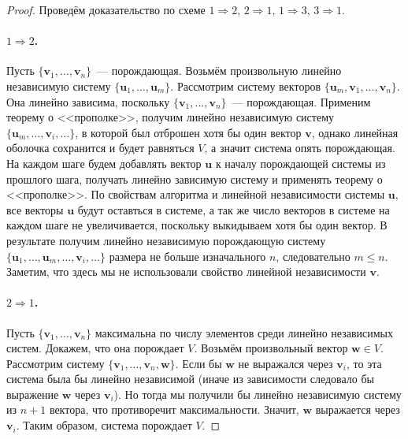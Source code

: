 \documentclass[10pt]{article}
\begin{document}
\begin{proof}
Проведём доказательство по схеме \(1 \Rightarrow 2\), \(2 \Rightarrow 1\), \(1 \Rightarrow 3\), \(3 \Rightarrow 1\).

\paragraph{\(1 \Rightarrow 2\).}
Пусть \(\{\mathbf{v}_1,\dots,\mathbf{v}_n\}\)~--- порождающая. Возьмём произвольную линейно независимую систему \(\{\mathbf{u}_1,\dots,\mathbf{u}_m\}\). Рассмотрим систему векторов \(\{\mathbf{u}_m, \mathbf{v}_1,\dots,\mathbf{v}_n\}\). Она линейно зависима, поскольку \(\{\mathbf{v}_1,\dots,\mathbf{v}_n\}\)~--- порождающая. Применим теорему о <<прополке>>, получим линейно независимую систему \(\{\mathbf{u}_m, \dots,\mathbf{v}_i, \dots\}\), в которой был отброшен хотя бы один вектор $\mathbf{v}$, однако линейная оболочка сохранится и будет равняться $V$, а значит система опять порождающая. На каждом шаге будем добавлять вектор $\mathbf{u}$ к началу порождающей системы из прошлого шага, получать линейно зависимую систему и применять теорему о <<прополке>>. По свойствам алгоритма и линейной независимости системы $\mathbf{u}$, все векторы $\mathbf{u}$ будут оставться в системе, а так же число векторов в системе на каждом шаге не увеличивается, поскольку выкидываем хотя бы один вектор. В результате получим линейно независимую порождающую систему \(\{\mathbf{u}_1, \dots, \mathbf{u}_m, \dots,\mathbf{v}_i, \dots\}\) размера не больше изначального $n$, следовательно $m \leq n$. Заметим, что здесь мы не использовали свойство линейной независимости $\mathbf{v}$.

\paragraph{\(2 \Rightarrow 1\).}
Пусть \(\{\mathbf{v}_1,\dots,\mathbf{v}_n\}\) максимальна по числу элементов среди линейно независимых систем. Докажем, что она порождает \(V\). Возьмём произвольный вектор \(\mathbf{w} \in V\). Рассмотрим систему \(\{\mathbf{v}_1,\dots,\mathbf{v}_n,\mathbf{w}\}\). Если бы \(\mathbf{w}\) не выражался через \(\mathbf{v}_i\), то эта система была бы линейно независимой (иначе из зависимости следовало бы выражение \(\mathbf{w}\) через \(\mathbf{v}_i\)). Но тогда мы получили бы линейно независимую систему из \(n+1\) вектора, что противоречит максимальности. Значит, \(\mathbf{w}\) выражается через \(\mathbf{v}_i\). Таким образом, система порождает \(V\).


\end{proof}
\end{document}
